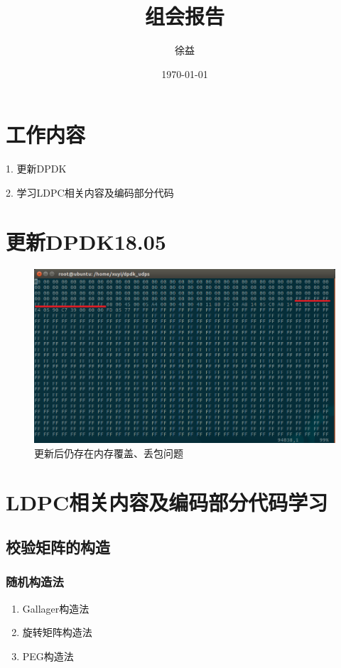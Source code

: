 \documentclass{article}
\title{组会报告}
\author{徐益}
\date{\today}
\begin{document}
\maketitle


\section{工作内容}

1. 更新DPDK

2. 学习LDPC相关内容及编码部分代码

\section{更新DPDK18.05}

\begin{figure}[H]
	\centering
	\includegraphics[width = \textwidth]{token_tc_bug.png}
	\caption{更新后仍存在内存覆盖、丢包问题}
\end{figure}

\section{LDPC相关内容及编码部分代码学习}
\subsection{校验矩阵的构造}
\subsubsection{随机构造法}
\begin{enumerate}
	\item Gallager构造法
	\item 旋转矩阵构造法
	\item PEG构造法
\end{enumerate}
\end{document}
